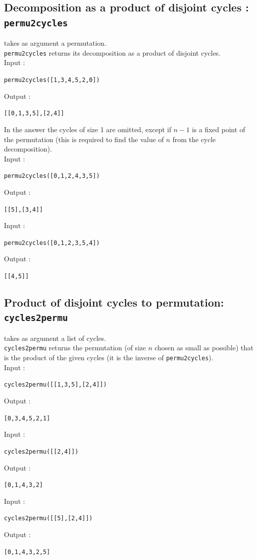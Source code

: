 \documentclass[a4paper,11pt]{book}
\begin{document}
\subsection{Decomposition as a product of disjoint cycles : \\
{\tt permu2cycles}}
 takes as argument a permutation.\\
{\tt permu2cycles} returns its decomposition as a product of
disjoint cycles.\\
Input :
\begin{center}{\tt permu2cycles([1,3,4,5,2,0])}\end{center}
Output :
\begin{center}{\tt [[0,1,3,5],[2,4]]}\end{center}
In the answer the cycles of size 1 are omitted, except if $n-1$ is a
fixed point of the permutation (this is required to find the value of
$n$ from the cycle decomposition).\\
Input :
\begin{center}{\tt permu2cycles([0,1,2,4,3,5])}\end{center}
Output :
\begin{center}{\tt [[5],[3,4]]}\end{center}
Input :
\begin{center}{\tt permu2cycles([0,1,2,3,5,4])}\end{center}
Output :
\begin{center}{\tt [[4,5]]}\end{center}

\subsection{Product of disjoint cycles to permutation: {\tt cycles2permu}}
 takes as argument a list of cycles.\\
{\tt cycles2permu} returns the permutation (of size $n$ chosen as small as 
possible) that is the product of the given cycles 
(it is the inverse of {\tt permu2cycles}).\\
Input :
\begin{center}{\tt cycles2permu([[1,3,5],[2,4]])}\end{center}
Output :
\begin{center}{\tt [0,3,4,5,2,1]}\end{center}
Input :
\begin{center}{\tt cycles2permu([[2,4]])}\end{center}
Output :
\begin{center}{\tt [0,1,4,3,2]}\end{center}
Input :
\begin{center}{\tt cycles2permu([[5],[2,4]])}\end{center}
Output :
\begin{center}{\tt [0,1,4,3,2,5]}\end{center}
\end{document}
